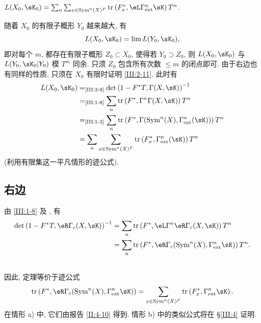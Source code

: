 \begin{lemma_}\label{III:2-11}
 $L(X_0,\sK_0) = \sum_n \sum_{x\in\operatorname{Sym}^n(X)^F} \tr\left(F_x^*,\eL\Gamma_\textnormal{ext}^n \sK\right) T^n$.
\end{lemma_}

随着 $X_0$ 的有限子概形 $Y_0$ 越来越大, 有
\[
  L(X_0,\sK_0) = \lim L(Y_0,\sK_0) \text{,}
\]
即对每个 $m$, 都存在有限子概形 $Z_0\subset X_0$, 使得若 $Y_0\supset Z_0$, 则 $L(X_0,\sK_0)$ 与 $L(Y_0,\sK_0|Y_0)$ 模 $T^m$ 同余.
只须 $Z_0$ 包含所有次数 $\leqslant m$ 的闭点即可. 由于右边也有同样的性质, 只须在 $X_0$ 有限时证明 \ref{III:2-11}. 此时有
\begin{align*}
  L(X_0,\sK_0)
    &=_\text{\ref{III:2-9}} \det\left(1-F^* T,\Gamma(X,\sK)\right)^{-1} \\
    &=_\text{\ref{III:1-8}} \sum_n \tr\left(F^*,\Gamma^n \Gamma(X,\sK)\right) T^n \\
    &=_\text{\ref{III:1-3}} \sum_n \tr\left(F^*,\Gamma(\operatorname{Sym}^n(X),\Gamma_\text{ext}^n(\sK))\right) T^n \\
    &= \sum_n \sum_{x\in \operatorname{Sym}^n(X)^F} \tr\left(F_x^*,\Gamma_\text{ext}^n(\sK)\right) T^n
\end{align*}
(利用有限集这一平凡情形的迹公式).

\subsection{右边}\label{III:2-12}

由 \ref{III:1-8} 及 \cite[XVII 5.5.21]{sga4}, 有
\begin{align*}
  \det\left(1-F^* T,\eR\Gamma_c(X,\sK)\right)^{-1}
    &= \sum_n \tr\left(F^*,\eL\Gamma^n\eR\Gamma_c(X,\sK)\right) T^n \\
    &= \sum_n \tr\left(F^*,\eR\Gamma_c(\operatorname{Sym}^n(X),\Gamma_\text{ext}^n\sK)\right) T^n \text{.}
\end{align*}

\subsection{}\label{III:2-13}

因此, 定理等价于迹公式
\[
  \tr\left(F^*,\eR\Gamma_c(\operatorname{Sym}^n(X),\Gamma_\text{ext}^n \sK)\right) = \sum_{x\in\operatorname{Sym}^n(X)^F} \tr\left(F_x^*,\Gamma_\text{ext}^n\sK\right) \text{.}
\]
在情形 a) 中, 它们由报告 \ref{II:4-10} 得到. 情形 b) 中的类似公式将在 \S\ref{III:4} 证明.

